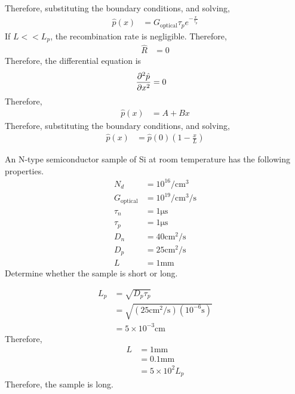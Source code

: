 \documentclass[titlepage, fleqn, a4paper, 12pt, twoside]{article}
\theoremstyle{definition}
\theoremstyle{theorem}
\begin{document}
Therefore, substituting the boundary conditions, and solving,
\begin{align*}
	\hat{p}(x) &= G_{\text{optical}} \tau_p e^{-\frac{x}{\tau_p}}
\end{align*}
If $L << L_p$, the recombination rate is negligible.
Therefore,
\begin{align*}
	\hat{R} &= 0
\end{align*}
Therefore, the differential equation is
\begin{align*}
	\dpd[2]{\hat{p}}{x} &= 0
\end{align*}
Therefore,
\begin{align*}
	\hat{p}(x) &= A + B x
\end{align*}
Therefore, substituting the boundary conditions, and solving,
\begin{align*}
	\hat{p}(x) &= \hat{p}(0) \left( 1 - \frac{x}{L} \right)
\end{align*}

\begin{question}
	An N-type semiconductor sample of Si at room temperature has the following properties.
	\begin{align*}
		N_d &= 10^{16} \si{\per\centi\metre\cubed}\\
		G_{\text{optical}} &= 10^{19} \si{\per\centi\metre\cubed\per\second}\\
		\tau_n &= 1 \si{\micro\second}\\
		\tau_p &= 1 \si{\micro\second}\\
		D_n &= 40 \si{\centi\metre\squared\per\second}\\
		D_p &= 25 \si{\centi\metre\squared\per\second}\\
		L &= 1 \si{\milli\meter}
	\end{align*}
	Determine whether the sample is short or long.
\end{question}

\begin{solution}
	\begin{align*}
		L_p &= \sqrt{D_p \tau_p}\\
		&= \sqrt{\left( 25 \si{\centi\metre\squared\per\second} \right) \left( 10^{-6} \si{\second} \right)}\\
		&= 5 \times 10^{-3} \si{\centi\metre}
	\end{align*}
	Therefore,
	\begin{align*}
		L &= 1 \si{\milli\meter}\\
		&= 0.1 \si{\milli\meter}\\
		&= 5 \times 10^2 L_p
	\end{align*}
	Therefore, the sample is long.
\end{solution}
\end{document}
